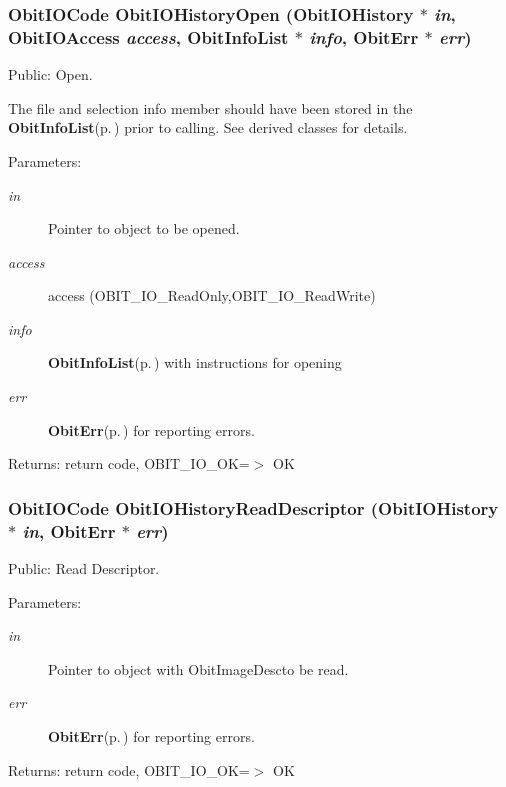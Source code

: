 \subsubsection{\setlength{\rightskip}{0pt plus 5cm}Obit\-IOCode Obit\-IOHistory\-Open ({\bf Obit\-IOHistory} $\ast$ {\em in}, Obit\-IOAccess {\em access}, {\bf Obit\-Info\-List} $\ast$ {\em info}, {\bf Obit\-Err} $\ast$ {\em err})}\label{ObitIOHistory_8h_a12}


Public: Open. 

The file and selection info member should have been stored in the {\bf Obit\-Info\-List}{\rm (p.\,\pageref{structObitInfoList})} prior to calling. See derived classes for details. \begin{Desc}
\item[Parameters:]
\begin{description}
\item[{\em in}]Pointer to object to be opened. \item[{\em access}]access (OBIT\_\-IO\_\-Read\-Only,OBIT\_\-IO\_\-Read\-Write) \item[{\em info}]{\bf Obit\-Info\-List}{\rm (p.\,\pageref{structObitInfoList})} with instructions for opening \item[{\em err}]{\bf Obit\-Err}{\rm (p.\,\pageref{structObitErr})} for reporting errors. \end{description}
\end{Desc}
\begin{Desc}
\item[Returns:]return code, OBIT\_\-IO\_\-OK=$>$ OK \end{Desc}
\subsubsection{\setlength{\rightskip}{0pt plus 5cm}Obit\-IOCode Obit\-IOHistory\-Read\-Descriptor ({\bf Obit\-IOHistory} $\ast$ {\em in}, {\bf Obit\-Err} $\ast$ {\em err})}\label{ObitIOHistory_8h_a18}


Public: Read Descriptor. 

\begin{Desc}
\item[Parameters:]
\begin{description}
\item[{\em in}]Pointer to object with Obit\-Image\-Descto be read. \item[{\em err}]{\bf Obit\-Err}{\rm (p.\,\pageref{structObitErr})} for reporting errors. \end{description}
\end{Desc}
\begin{Desc}
\item[Returns:]return code, OBIT\_\-IO\_\-OK=$>$ OK \end{Desc}
